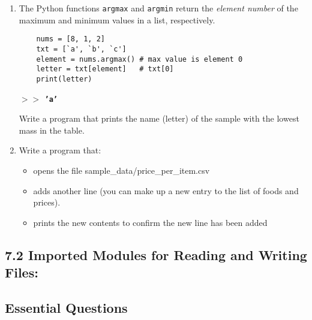 \documentclass[11pt]{report}
\begin{document}
\begin{enumerate}[label=(\Alph*)]
    
    \item The Python functions {\tt argmax} and {\tt argmin} return the {\it element number} of the maximum and minimum values in a list, respectively. 

    \vspace{0.5 em}
    \begin{verbatim}
    nums = [8, 1, 2] 
    txt = [`a', `b', `c']
    element = nums.argmax() # max value is element 0
    letter = txt[element]   # txt[0] 
    print(letter)
    \end{verbatim}
    {\bf $>$$>$ {\tt 'a'}}
    
    Write a program that prints the name (letter) of the sample with the lowest mass in the table. 
    
    
    \item Write a program that:
    \begin{itemize}
        \item opens the file sample\_data/price\_per\_item.csv
        \item adds another line (you can make up a new entry to the list of foods and prices).
        \item prints the new contents to confirm the new line has been added
    \end{itemize} 
        
    

    
\end{enumerate}

\subsection*{\Large 7.2 Imported Modules for Reading and Writing Files:}

\subsection*{Essential Questions}

\begin{Exercise}[title= Writing csv files]

\ExeText{}


\end{Exercise}
\end{document}
